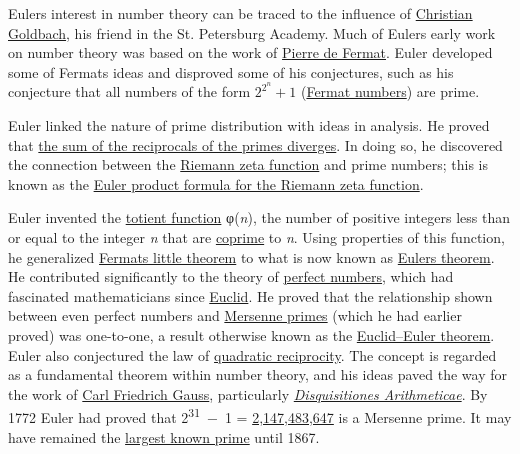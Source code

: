 Euler\textquotesingle s interest in number theory can be traced to the influence of \href{https://en.wikipedia.org/wiki/Christian_Goldbach}{Christian Goldbach}, his friend in the St. Petersburg Academy. Much of Euler\textquotesingle s early work on number theory was based on the work of \href{https://en.wikipedia.org/wiki/Pierre_de_Fermat}{Pierre de Fermat}. Euler developed some of Fermat\textquotesingle s ideas and disproved some of his conjectures, such as his conjecture that all numbers of the form {{\(2^{2^{n}} + 1\)}{}} (\href{https://en.wikipedia.org/wiki/Fermat_numbers}{Fermat numbers}) are prime.

Euler linked the nature of prime distribution with ideas in analysis. He proved that \href{https://en.wikipedia.org/wiki/Proof_that_the_sum_of_the_reciprocals_of_the_primes_diverges}{the sum of the reciprocals of the primes diverges}. In doing so, he discovered the connection between the \href{https://en.wikipedia.org/wiki/Riemann_zeta_function}{Riemann zeta function} and prime numbers; this is known as the \href{https://en.wikipedia.org/wiki/Proof_of_the_Euler_product_formula_for_the_Riemann_zeta_function}{Euler product formula for the Riemann zeta function}.

Euler invented the \href{https://en.wikipedia.org/wiki/Totient_function}{totient function} φ(\emph{n}), the number of positive integers less than or equal to the integer \emph{n} that are \href{https://en.wikipedia.org/wiki/Coprime}{coprime} to \emph{n}. Using properties of this function, he generalized \href{https://en.wikipedia.org/wiki/Fermat's_little_theorem}{Fermat\textquotesingle s little theorem} to what is now known as \href{https://en.wikipedia.org/wiki/Euler's_theorem}{Euler\textquotesingle s theorem}. He contributed significantly to the theory of \href{https://en.wikipedia.org/wiki/Perfect_number}{perfect numbers}, which had fascinated mathematicians since \href{https://en.wikipedia.org/wiki/Euclid}{Euclid}. He proved that the relationship shown between even perfect numbers and \href{https://en.wikipedia.org/wiki/Mersenne_prime}{Mersenne primes} (which he had earlier proved) was one-to-one, a result otherwise known as the \href{https://en.wikipedia.org/wiki/Euclid–Euler_theorem}{Euclid--Euler theorem}. Euler also conjectured the law of \href{https://en.wikipedia.org/wiki/Quadratic_reciprocity}{quadratic reciprocity}. The concept is regarded as a fundamental theorem within number theory, and his ideas paved the way for the work of \href{https://en.wikipedia.org/wiki/Carl_Friedrich_Gauss}{Carl Friedrich Gauss}, particularly \emph{\href{https://en.wikipedia.org/wiki/Disquisitiones_Arithmeticae}{Disquisitiones Arithmeticae}}. By 1772 Euler had proved that 2\textsuperscript{31}{~}−{~}1 = \href{https://en.wikipedia.org/wiki/2147483647}{2,147,483,647} is a Mersenne prime. It may have remained the \href{https://en.wikipedia.org/wiki/Largest_known_prime}{largest known prime} until 1867.

